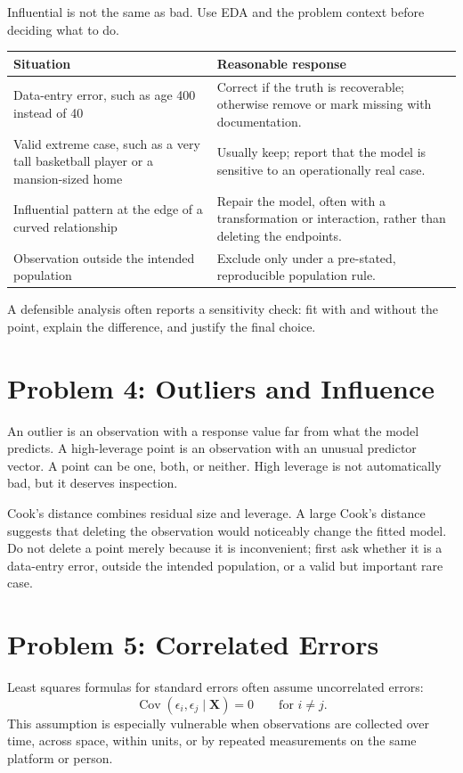 {Influential is not the same as bad.  Use EDA and the problem context before deciding what to do.
\begin{center}
\begin{tabular}{p{}p{}}
\toprule
Situation & Reasonable response \\
\midrule
Data-entry error, such as age 400 instead of 40 & Correct if the truth is recoverable; otherwise remove or mark missing with documentation. \\
Valid extreme case, such as a very tall basketball player or a mansion-sized home & Usually keep; report that the model is sensitive to an operationally real case. \\
Influential pattern at the edge of a curved relationship & Repair the model, often with a transformation or interaction, rather than deleting the endpoints. \\
Observation outside the intended population & Exclude only under a pre-stated, reproducible population rule. \\
\bottomrule
\end{tabular}
\end{center}

A defensible analysis often reports a sensitivity check: fit with and without the point, explain the difference, and justify the final choice.

}{
\section{Problem 4: Outliers and Influence}

An outlier is an observation with a response value far from what the model predicts.  A high-leverage point is an observation with an unusual predictor vector.  A point can be one, both, or neither.  High leverage is not automatically bad, but it deserves inspection.

Cook's distance combines residual size and leverage.  A large Cook's distance suggests that deleting the observation would noticeably change the fitted model.  Do not delete a point merely because it is inconvenient; first ask whether it is a data-entry error, outside the intended population, or a valid but important rare case.

}
\section{Problem 5: Correlated Errors}

Least squares formulas for standard errors often assume uncorrelated errors:
\begin{equation}
  \operatorname{Cov}(\epsilon_i,\epsilon_j\mid\mathbf{X})=0
  \qquad\text{for }i\ne j.
\end{equation}
This assumption is especially vulnerable when observations are collected over time, across space, within units, or by repeated measurements on the same platform or person.

